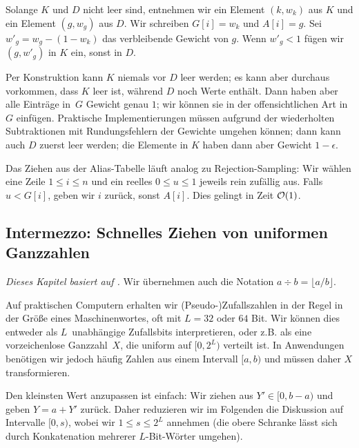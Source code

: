 Solange $K$ und $D$ nicht leer sind, entnehmen wir ein Element $(k, w_k)$ aus $K$ und ein Element $(g, w_g)$ aus $D$.
Wir schreiben $G[i] = w_k$ und $A[i] = g$.
Sei $w'_g = w_g - (1 - w_k)$ das verbleibende Gewicht von $g$.
Wenn $w'_g < 1$ fügen wir $(g, w'_g)$ in $K$ ein, sonst in $D$.

Per Konstruktion kann $K$ niemals vor $D$ leer werden; es kann aber durchaus vorkommen, dass $K$ leer ist, während $D$ noch Werte enthält.
Dann haben aber alle Einträge in~$G$ Gewicht genau $1$; wir können sie in der offensichtlichen Art in $G$ einfügen.
Praktische Implementierungen müssen aufgrund der wiederholten Subtraktionen mit Rundungsfehlern der Gewichte umgehen können;
dann kann auch $D$ zuerst leer werden; die Elemente in $K$ haben dann aber Gewicht $1 - \epsilon$.

Das Ziehen aus der Alias-Tabelle läuft analog zu Rejection-Sampling:
Wir wählen eine Zeile $1 \le i \le n$ und ein reelles $0 \le u \le 1$ jeweils rein zufällig aus.
Falls $u < G[i]$, geben wir $i$ zurück, sonst $A[i]$.
Dies gelingt in Zeit $\mathcal{O}\!\left(1\right)$.

\subsection{Intermezzo: Schnelles Ziehen von uniformen Ganzzahlen}\label{subsec:uniforme_ganzzahlen}
\emph{Dieses Kapitel basiert auf \cite{DBLP:journals/tomacs/Lemire19}.}
Wir übernehmen auch die Notation $a \div b = \lfloor a / b \rfloor$.

\bigskip

Auf praktischen Computern erhalten wir (Pseudo-)Zufallszahlen in der Regel in der Größe eines Maschinenwortes, oft mit $L = 32$ oder $64$ Bit.
Wir können dies entweder als $L$~unabhängige Zufallsbits interpretieren, oder z.B. als eine vorzeichenlose Ganzzahl~$X$, die uniform auf $[0, 2^L)$ verteilt ist.
In Anwendungen benötigen wir jedoch häufig Zahlen aus einem Intervall $[a, b)$ und müssen daher $X$ transformieren.

Den kleinsten Wert anzupassen ist einfach: Wir ziehen aus $Y' \in [0, b-a)$ und geben $Y = a + Y'$ zurück.
Daher reduzieren wir im Folgenden die Diskussion auf Intervalle $[0, s)$, wobei wir $1 \le s \le 2^L$ annehmen (die obere Schranke lässt sich durch Konkatenation mehrerer $L$-Bit-Wörter umgehen).

